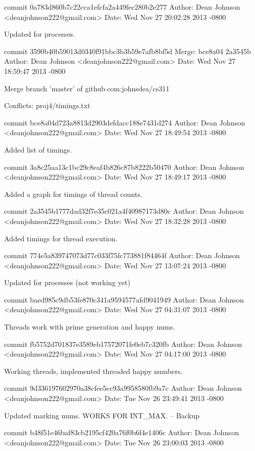\documentclass[fleqn,10pt,titlepage]{article}
\begin{document}
commit 0a783d860b7c22cca1efcfa2a449fec280b2e277
Author: Dean Johnson <deanjohnson222@gmail.com>
Date:   Wed Nov 27 20:02:28 2013 -0800

    Updated for processes.

commit 3590b40b59013d0340f91bbc3b3b59e7afb8bf5d
Merge: bce8a04 2a3545b
Author: Dean Johnson <deanjohnson222@gmail.com>
Date:   Wed Nov 27 18:59:47 2013 -0800

    Merge branch 'master' of github.com:johnsdea/cs311

    Conflicts:
        proj4/timings.txt

commit bce8a04d723a8813d2903defdacc188e7431d274
Author: Dean Johnson <deanjohnson222@gmail.com>
Date:   Wed Nov 27 18:49:54 2013 -0800

    Added list of timings.

commit 3a8c25aa13c1bc29c8eaf4b826c87b8222b50470
Author: Dean Johnson <deanjohnson222@gmail.com>
Date:   Wed Nov 27 18:49:17 2013 -0800

    Added a graph for timings of thread counts.

commit 2a3545b1777dad32f7e35c021a4f40987173d80c
Author: Dean Johnson <deanjohnson222@gmail.com>
Date:   Wed Nov 27 18:32:28 2013 -0800

    Added timings for thread execution.

commit 774e5a839747073d77c033f75fc773881f84464f
Author: Dean Johnson <deanjohnson222@gmail.com>
Date:   Wed Nov 27 13:07:24 2013 -0800

    Updated for processes (not working yet)

commit baed985c9db53fe870c341a9594577afd9041949
Author: Dean Johnson <deanjohnson222@gmail.com>
Date:   Wed Nov 27 04:31:07 2013 -0800

    Threads work with prime generation and happy nums.

commit fb5752d701837e3589eb17572071fe0eb7c320fb
Author: Dean Johnson <deanjohnson222@gmail.com>
Date:   Wed Nov 27 04:17:00 2013 -0800

    Working threads, implemented threaded happy numbers.

commit 9d336197602970a38cfee5cc93a9958580fb9a7c
Author: Dean Johnson <deanjohnson222@gmail.com>
Date:   Tue Nov 26 23:49:41 2013 -0800

    Updated marking nums. WORKS FOR INT_MAX. -- Backup

commit b48f51e46baf83cb2195cf420a76f0b6f4e1406c
Author: Dean Johnson <deanjohnson222@gmail.com>
Date:   Tue Nov 26 23:00:03 2013 -0800
\end{document}
